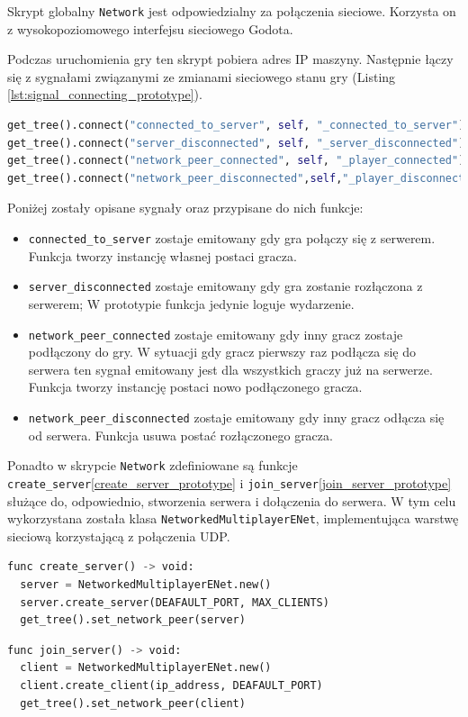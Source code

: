 Skrypt globalny \texttt{Network} jest odpowiedzialny za połączenia sieciowe. Korzysta on z wysokopoziomowego interfejsu sieciowego Godota. 

Podczas uruchomienia gry ten skrypt pobiera adres IP maszyny. Następnie łączy się z sygnałami związanymi ze zmianami sieciowego stanu gry (Listing \ref{lst:signal_connecting_prototype}). 


\begin{lstlisting}[language=python,caption=Podłączanie do najważniejszych sygnałów sieciowych, label=lst:signal_connecting_prototype ,basicstyle=\footnotesize\ttfamily]
get_tree().connect("connected_to_server", self, "_connected_to_server")
get_tree().connect("server_disconnected", self, "_server_disconnected")
get_tree().connect("network_peer_connected", self, "_player_connected")
get_tree().connect("network_peer_disconnected",self,"_player_disconnected")
\end{lstlisting}

Poniżej zostały opisane sygnały oraz przypisane do nich funkcje:
\begin{itemize}
    \item \texttt{connected\_to\_server} zostaje emitowany gdy gra połączy się z serwerem. Funkcja tworzy instancję własnej postaci gracza.
    \item \texttt{server\_disconnected} zostaje emitowany gdy gra zostanie rozłączona z serwerem; W prototypie funkcja jedynie loguje wydarzenie.
    \item \texttt{network\_peer\_connected} zostaje emitowany gdy inny gracz zostaje podłączony do gry. W sytuacji gdy gracz pierwszy raz podłącza się do serwera ten sygnał emitowany jest dla wszystkich graczy już na serwerze. Funkcja tworzy instancję postaci nowo podłączonego gracza.
    \item \texttt{network\_peer\_disconnected} zostaje emitowany gdy inny gracz odłącza się od serwera. Funkcja usuwa postać rozłączonego gracza.
\end{itemize}

Ponadto w skrypcie \texttt{Network} zdefiniowane są funkcje \texttt{create\_server}\ref{create_server_prototype} i \texttt{join\_server}\ref{join_server_prototype} służące do, odpowiednio, stworzenia serwera i dołączenia do serwera. W tym celu wykorzystana została klasa \texttt{NetworkedMultiplayerENet}, implementująca warstwę sieciową korzystającą z połączenia UDP.


\begin{lstlisting}[language=python,caption=Funkcja inicjująca serwer gry., label=lst:create_server_prototype ,basicstyle=\footnotesize\ttfamily]
func create_server() -> void:
  server = NetworkedMultiplayerENet.new()
  server.create_server(DEAFAULT_PORT, MAX_CLIENTS)
  get_tree().set_network_peer(server)
\end{lstlisting}
\begin{lstlisting}[language=python,caption=Funkcja łącząca do serwera gry., label=lst:join_server_prototype ,basicstyle=\footnotesize\ttfamily]
func join_server() -> void:
  client = NetworkedMultiplayerENet.new()
  client.create_client(ip_address, DEAFAULT_PORT)
  get_tree().set_network_peer(client)
\end{lstlisting}

